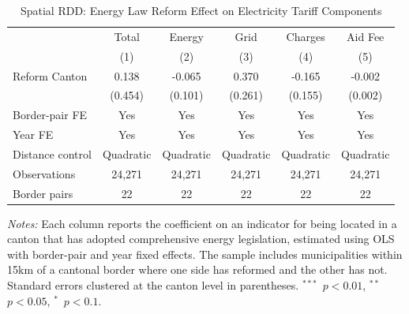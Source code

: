 \begin{table}[htbp]
\centering
\caption{Spatial RDD: Energy Law Reform Effect on Electricity Tariff Components}
\label{tab:main_rdd}
\begin{tabular}{lccccc}
\toprule
 & Total & Energy & Grid & Charges & Aid Fee \\
 & (1) & (2) & (3) & (4) & (5) \\
\midrule
Reform Canton & 0.138 & -0.065 & 0.370 & -0.165 & -0.002 \\
 & (0.454) & (0.101) & (0.261) & (0.155) & (0.002) \\
\midrule
Border-pair FE & Yes & Yes & Yes & Yes & Yes \\
Year FE & Yes & Yes & Yes & Yes & Yes \\
Distance control & Quadratic & Quadratic & Quadratic & Quadratic & Quadratic \\
Observations & 24,271 & 24,271 & 24,271 & 24,271 & 24,271 \\
Border pairs & 22 & 22 & 22 & 22 & 22 \\
\bottomrule
\end{tabular}
\begin{tablenotes}[flushleft]
\small
\item \textit{Notes:} Each column reports the coefficient on an indicator for being located in a canton that has adopted comprehensive energy legislation, estimated using OLS with border-pair and year fixed effects. The sample includes municipalities within 15km of a cantonal border where one side has reformed and the other has not. Standard errors clustered at the canton level in parentheses. $^{***}$~$p<0.01$, $^{**}$~$p<0.05$, $^{*}$~$p<0.1$.
\end{tablenotes}
\end{table}

